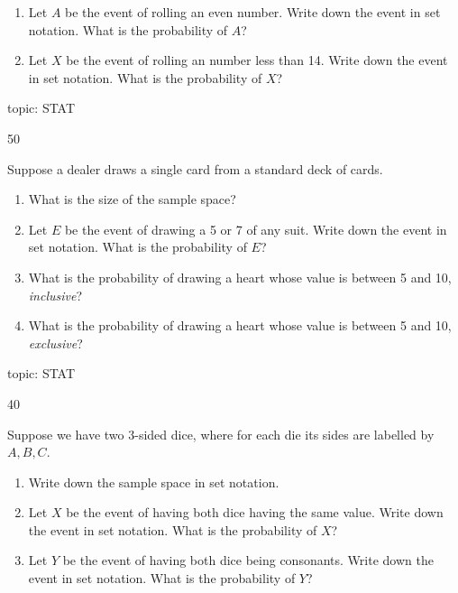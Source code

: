 \documentclass[12 pt]{article}
\begin{document}
\begin{itemize}
{\begin{enumerate}
\item Let $A$ be the event of rolling an even number.  Write down the event in set notation.
What is the probability of $A$?

\item Let $X$ be the event of rolling an number less than 14.  Write down the event in set notation.
What is the probability of $X$?

\end{enumerate}

} {



} {}{topic: STAT} 


 \ex
{}{50}
{  
Suppose a dealer draws a single card from a standard deck of cards.

\begin{enumerate}

\item What is the size of  the sample space?

\item Let $E$ be the event of drawing a 5 or 7 of any suit.
Write down the event in set notation.
What is the probability of $E$?

\item What is the probability of drawing a heart whose value is between 5 and 10, \emph{inclusive}?

\item What is the probability of drawing a heart whose value is between 5 and 10, \emph{exclusive}?


\end{enumerate}

} {

} {}{topic: STAT} 


 \ex
{}{40}
{  
Suppose we have two 3-sided dice, where for each die its sides are labelled by $A, B, C$.

\begin{enumerate}

\item Write down the sample space in set notation.

\item Let $X$ be the event of having both dice having the same value.
Write down the event in set notation.
What is the probability of $X$?

\item Let $Y$ be the event of having both dice being consonants.
Write down the event in set notation.
What is the probability of $Y$?



\end{enumerate}}
\end{itemize}
\end{document}
